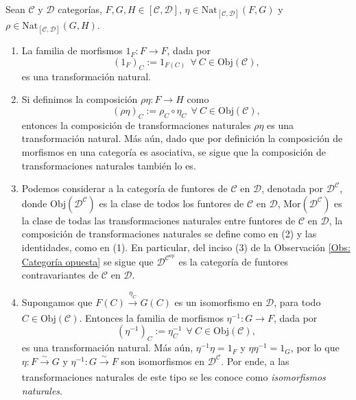 \documentclass[tesis]{subfiles}
\begin{document}
\begin{Obs}\label{Obs: Transformaciones naturales}

    Sean $\mathscr{C}$ y $\mathscr{D}$ categorías, $F,G,H\in[\mathscr{C},\mathscr{D}]$, $\eta\in\text{Nat}_{[\mathscr{C},\mathscr{D}]}(F,G)$ y $\rho\in\text{Nat}_{[\mathscr{C},\mathscr{D}]}(G,H)$.
    
    \begin{enumerate}[label=(\arabic*)]
    
        \item La familia de morfismos $1_F:F\to F$, dada por
            \[
                (1_F)_C := 1_{F(C)} \ \ \forall \ C\in\text{Obj}(\mathscr{C}),
            \] 
            es una transformación natural.

        \item Si definimos la composición $\rho\eta:F\to H$ como
            \[
                (\rho\eta)_C:=\rho_C\circ\eta_C \ \ \forall \ C\in\text{Obj}(\mathscr{C}),
            \] 
            entonces la composición de transformaciones naturales $\rho\eta$ es una transformación natural. Más aún, dado que por definición la composición de morfismos en una categoría es asociativa, se sigue que la composición de transformaciones naturales también lo es.

        \item Podemos considerar a la categoría de funtores de $\mathscr{C}$ en $\mathscr{D}$, denotada por $\mathscr{D}^\mathscr{C}$, donde $\text{Obj}(\mathscr{D}^\mathscr{C})$ es la clase de todos los funtores de $\mathscr{C}$ en $\mathscr{D}$, $\text{Mor}(\mathscr{D}^\mathscr{C})$ es la clase de todas las transformaciones naturales entre funtores de $\mathscr{C}$ en $\mathscr{D}$, la composición de transformaciones naturales se define como en (2) y las identidades, como en (1). En particular, del inciso (3) de la Observación \ref{Obs: Categoría opuesta} se sigue que $\mathscr{D}^{\mathscr{C}^\text{op}}$ es la categoría de funtores contravariantes de $\mathscr{C}$ en $\mathscr{D}$.

        \item Supongamos que $F(C)\xrightarrow[]{\eta_C} G(C)$ es un isomorfismo en $\mathscr{D}$, para todo $C\in\text{Obj}(\mathscr{C})$. Entonces la familia de morfismos $\eta^{-1}:G\to F$, dada por 
            \[
            (\eta^{-1})_C:=\eta_C^{-1} \ \ \forall \ C\in\text{Obj}(\mathscr{C}),
            \] 
            es una transformación natural. Más aún, $\eta^{-1}\eta = 1_F$ y $\eta\eta^{-1}=1_G$, por lo que $\eta:F\xrightarrow[]{\sim}G$ y $\eta^{-1}:G\xrightarrow[]{\sim}F$ son isomorfismos en $\mathscr{D}^\mathscr{C}$. Por ende, a las transformaciones naturales de este tipo se les conoce como \emph{isomorfismos naturales}.
    \end{enumerate}
\end{Obs}
\end{document}

